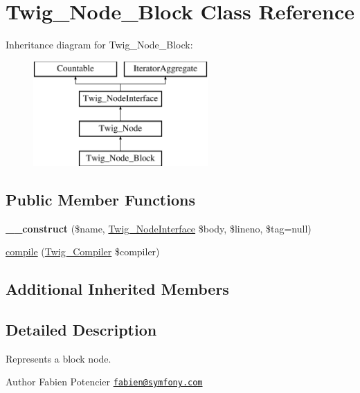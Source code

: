 \hypertarget{class_twig___node___block}{}\section{Twig\+\_\+\+Node\+\_\+\+Block Class Reference}
\label{class_twig___node___block}
Inheritance diagram for Twig\+\_\+\+Node\+\_\+\+Block\+:\begin{figure}[H]
\begin{center}
\leavevmode
\includegraphics[height=4.000000cm]{class_twig___node___block}
\end{center}
\end{figure}
\subsection*{Public Member Functions}
\begin{DoxyCompactItemize}
\item 
\hypertarget{class_twig___node___block_a6edceecc26fb2d0e0ba4cc3aeca3aa77}{}{\bfseries \+\_\+\+\_\+construct} (\$name, \hyperlink{interface_twig___node_interface}{Twig\+\_\+\+Node\+Interface} \$body, \$lineno, \$tag=null)\label{class_twig___node___block_a6edceecc26fb2d0e0ba4cc3aeca3aa77}

\item 
\hyperlink{class_twig___node___block_a4e0faa87c3fae583620b84d3607085da}{compile} (\hyperlink{class_twig___compiler}{Twig\+\_\+\+Compiler} \$compiler)
\end{DoxyCompactItemize}
\subsection*{Additional Inherited Members}


\subsection{Detailed Description}
Represents a block node.

\begin{DoxyAuthor}{Author}
Fabien Potencier \href{mailto:fabien@symfony.com}{\tt fabien@symfony.\+com} 
\end{DoxyAuthor}


